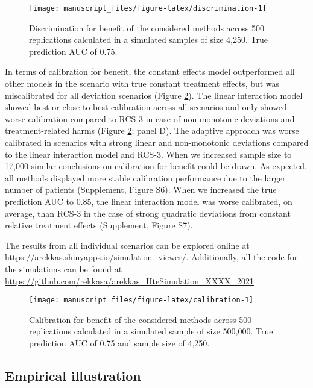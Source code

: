 \documentclass[]{elsarticle} %
\begin{document}
\begin{figure}
\texttt{[image: manuscript\_files/figure-latex/discrimination-1]} \caption{Discrimination for benefit of the considered methods across 500 replications calculated in a simulated samples of size 4,250. True prediction AUC of 0.75.}\label{fig:discrimination}
\end{figure}

In terms of calibration for benefit, the constant effects model
outperformed all other models in the scenario with true constant
treatment effects, but was miscalibrated for all deviation scenarios
(Figure \ref{fig:calibration}). The linear interaction model showed best
or close to best calibration across all scenarios and only showed worse
calibration compared to RCS-3 in case of non-monotonic deviations and
treatment-related harms (Figure \ref{fig:calibration}; panel D). The
adaptive approach was worse calibrated in scenarios with strong linear
and non-monotonic deviations compared to the linear interaction model
and RCS-3. When we increased sample size to 17,000 similar conclusions
on calibration for benefit could be drawn. As expected, all methods
displayed more stable calibration performance due to the larger number
of patients (Supplement, Figure S6). When we increased the true
prediction AUC to 0.85, the linear interaction model was worse
calibrated, on average, than RCS-3 in the case of strong quadratic
deviations from constant relative treatment effects (Supplement, Figure
S7).

The results from all individual scenarios can be explored online at
\url{https://arekkas.shinyapps.io/simulation_viewer/}. Additionally, all
the code for the simulations can be found at
\url{https://github.com/rekkasa/arekkas_HteSimulation_XXXX_2021}

\begin{figure}
\texttt{[image: manuscript\_files/figure-latex/calibration-1]} \caption{Calibration for benefit of the considered methods across 500 replications calculated in a simulated sample of size 500,000. True prediction AUC of 0.75 and sample size of 4,250.}\label{fig:calibration}
\end{figure}

\hypertarget{empirical-illustration-1}{%
\subsection{Empirical illustration}\label{empirical-illustration-1}}
\end{document}
